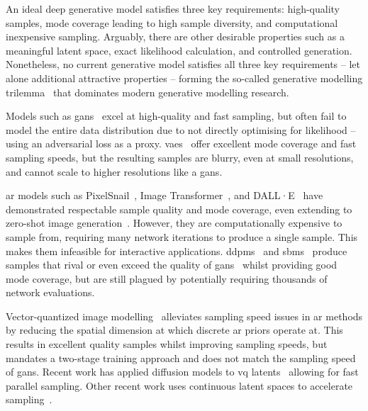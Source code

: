 
An ideal deep generative model satisfies three key requirements: high-quality
samples, mode coverage leading to high sample diversity, and computational
inexpensive sampling. Arguably, there are other desirable properties such as a
meaningful latent space, exact likelihood calculation, and controlled
generation. Nonetheless, no current generative model satisfies all three key
requirements -- let alone additional attractive properties -- forming the
so-called generative modelling trilemma~\cite{xiao2021trilemma} that dominates
modern generative modelling research.

Models such as \glspl{gan}~\cite{goodfellow2014gan} excel at high-quality and
fast sampling, but often fail to model the entire data distribution due to not
directly optimising for likelihood -- using an adversarial loss as a proxy.
\Glspl{vae}~\cite{kingma2013vae} offer excellent mode coverage and fast sampling
speeds, but the resulting samples are blurry, even at small resolutions, and
cannot scale to higher resolutions like a \glspl{gan}.

\Gls{ar} models such as PixelSnail~\cite{chen2017snail}, Image
Transformer~\cite{parmar2018image}, and DALL·E~\cite{parmar2018image} have
demonstrated respectable sample quality and mode coverage, even extending to
zero-shot image generation~\cite{ramesh2021dalle}. However, they are
computationally expensive to sample from, requiring many network iterations to
produce a single sample. This makes them infeasible for interactive
applications. \Glspl{ddpm}~\cite{ho2020ddpm} and
\glspl{sbm}~\cite{song2019sbm,song2020sde,song2021mlt} produce samples that
rival or even exceed the quality of \glspl{gan}~\cite{dhariwal2021ddpm} whilst
providing good mode coverage, but are still plagued by potentially
requiring thousands of network evaluations.

Vector-quantized image
modelling~\cite{oord2017vqvae,razavi2019generating,esser2021taming} alleviates
sampling speed issues in \gls{ar} methods by reducing the spatial dimension at
which discrete \gls{ar} priors operate at. This results in excellent quality
samples whilst improving sampling speeds, but mandates a two-stage training
approach and does not match the sampling speed of \glspl{gan}. Recent work has
applied diffusion models to \gls{vq} latents~\cite{bondtaylor2021unleashing}
allowing for fast parallel sampling. Other recent work uses continuous latent
spaces to accelerate sampling~\cite{xiao2021trilemma,vahdat2021sbmlatent}.

